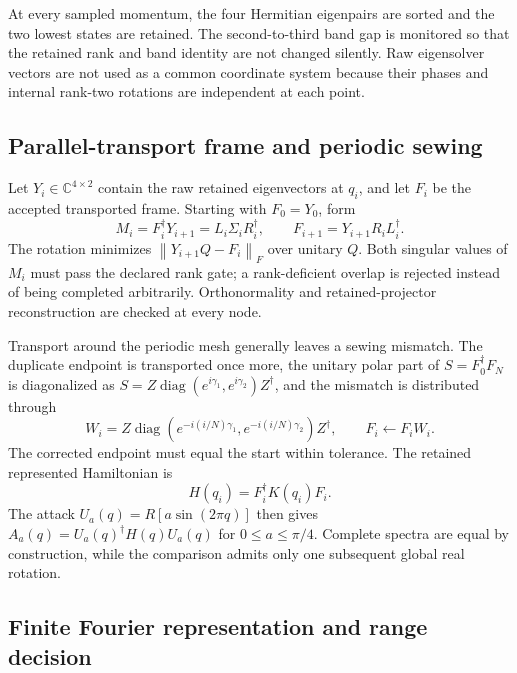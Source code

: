 \documentclass[11pt]{article}
\theoremstyle{definition}
\newcommand{\norm}[1]{\left\lVert#1\right\rVert}
\newcommand{\C}{\mathbb C}
\begin{document}
At every sampled momentum, the four Hermitian eigenpairs are sorted and the two lowest
states are retained.  The second-to-third band gap is monitored so that the retained
rank and band identity are not changed silently.  Raw eigensolver vectors are not used
as a common coordinate system because their phases and internal rank-two rotations are
independent at each point.

\subsection{Parallel-transport frame and periodic sewing}

Let $Y_i\in\C^{4\times2}$ contain the raw retained eigenvectors at $q_i$, and let $F_i$
be the accepted transported frame.  Starting with $F_0=Y_0$, form
\begin{equation}
 M_i=F_i^\dagger Y_{i+1}=L_i\Sigma_iR_i^\dagger,
 \qquad F_{i+1}=Y_{i+1}R_iL_i^\dagger.
 \label{eq:rank2-parallel-transport}
\end{equation}
The rotation minimizes $\norm{Y_{i+1}Q-F_i}_F$ over unitary $Q$.  Both singular values
of $M_i$ must pass the declared rank gate; a rank-deficient overlap is rejected instead
of being completed arbitrarily.  Orthonormality and retained-projector reconstruction
are checked at every node.

Transport around the periodic mesh generally leaves a sewing mismatch.  The duplicate
endpoint is transported once more, the unitary polar part of
$S=F_0^\dagger F_N$ is diagonalized as
$S=Z\operatorname{diag}(e^{i\gamma_1},e^{i\gamma_2})Z^\dagger$, and the mismatch is
distributed through
\begin{equation}
 W_i=Z\operatorname{diag}(e^{-i(i/N)\gamma_1},e^{-i(i/N)\gamma_2})Z^\dagger,
 \qquad F_i\leftarrow F_iW_i.
 \label{eq:rank2-sewing}
\end{equation}
The corrected endpoint must equal the start within tolerance.  The retained represented
Hamiltonian is
\begin{equation}
 H(q_i)=F_i^\dagger K(q_i)F_i.
 \label{eq:rank2-retained-field}
\end{equation}
The attack $U_a(q)=R[a\sin(2\pi q)]$ then gives
$A_a(q)=U_a(q)^\dagger H(q)U_a(q)$ for $0\le a\le\pi/4$.  Complete spectra are equal by
construction, while the comparison admits only one subsequent global real rotation.

\subsection{Finite Fourier representation and range decision}
\end{document}
